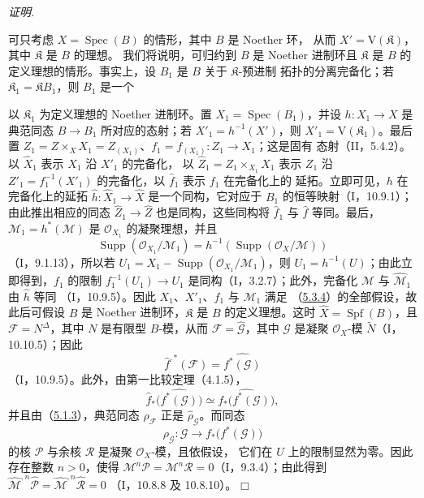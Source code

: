 \documentclass[UTF8,fontset=none,11pt,oneside,openany]{ctexbook}
\providecommand{\square}{\mdlgwhtsquare}
\newenvironment{proof}{%
  \par\smallskip\noindent\textit{证明.}\ %
}{\hfill$\square$\par}
\newcommand{\oldpage}[2][]{%
  \hypertarget{ega-source-page-#1-#2}{}%
  \marginnote{\scriptsize\textbf{#1}~|~#2}\ignorespaces}
\begin{document}
\begin{proof}
可只考虑 $X=\operatorname{Spec}(B)$ 的情形，其中 $B$ 是 Noether 环，
从而 $X'=\mathrm V(\mathfrak K)$，其中 $\mathfrak K$ 是 $B$ 的理想。
我们将说明，可归约到 $B$ 是 Noether 进制环且 $\mathfrak K$ 是 $B$
的定义理想的情形。事实上，设 $B_1$ 是 $B$ 关于 $\mathfrak K$-预进制
拓扑的分离完备化；若 $\mathfrak K_1=\mathfrak K B_1$，则 $B_1$ 是一个

\oldpage[III]{155}

以 $\mathfrak K_1$ 为定义理想的 Noether 进制环。置
$X_1=\operatorname{Spec}(B_1)$，并设 $h:X_1\to X$ 是典范同态
$B\to B_1$ 所对应的态射；若 $X'_1=h^{-1}(X')$，则
$X'_1=\mathrm V(\mathfrak K_1)$。最后置
$Z_1=Z\times_X X_1=Z_{(X_1)}$、$f_1=f_{(X_1)}:Z_1\to X_1$；这是固有
态射（II，5.4.2）。以 $\widehat X_1$ 表示 $X_1$ 沿 $X'_1$ 的完备化，
以 $\widehat Z_1=Z_1\times_{X_1}\widehat X_1$ 表示 $Z_1$ 沿
$Z'_1=f_1^{-1}(X'_1)$ 的完备化，以 $\widehat f_1$ 表示 $f_1$ 在完备化上的
延拓。立即可见，$h$ 在完备化上的延拓
$\widehat h:\widehat X_1\to\widehat X$ 是一个同构，它对应于 $B_1$
的恒等映射（I，10.9.1）；由此推出相应的同态
$\widehat Z_1\to\widehat Z$ 也是同构，这些同构将 $\widehat f_1$ 与
$\widehat f$ 等同。最后，$\mathcal M_1=h^*(\mathcal M)$ 是
$\mathcal O_{X_1}$ 的凝聚理想，并且
\[
\operatorname{Supp}(\mathcal O_{X_1}/\mathcal M_1)
=h^{-1}(\operatorname{Supp}(\mathcal O_X/\mathcal M))
\]
（I，9.1.13），所以若
$U_1=X_1-\operatorname{Supp}(\mathcal O_{X_1}/\mathcal M_1)$，则
$U_1=h^{-1}(U)$；由此立即得到，$f_1$ 的限制
$f_1^{-1}(U_1)\to U_1$ 是同构（I，3.2.7）；此外，完备化
$\widehat{\mathcal M}$ 与 $\widehat{\mathcal M}_1$ 由 $\widehat h$ 等同
（I，10.9.5）。因此 $X_1$、$X'_1$、$f_1$ 与 $\mathcal M_1$ 满足
（\hyperref[III.5.3.4-fr]{5.3.4}）的全部假设，故此后可假设 $B$ 是
Noether 进制环，$\mathfrak K$ 是 $B$ 的定义理想。这时
$\widehat X=\operatorname{Spf}(B)$，且 $\mathcal F=N^\Delta$，其中 $N$
是有限型 $B$-模，从而 $\mathcal F=\widehat{\mathcal G}$，其中
$\mathcal G$ 是凝聚 $\mathcal O_X$-模 $\widetilde N$（I，10.10.5）；因此
\[
\widehat f^{,*}(\mathcal F)=\widehat{f^*(\mathcal G)}
\]
（I，10.9.5）。此外，由第一比较定理（4.1.5），
\[
\widehat f_*\bigl(\widehat{f^*(\mathcal G)}\bigr)
\simeq\widehat{f_*\bigl(f^*(\mathcal G)\bigr)},
\]
并且由（\hyperref[III.5.1.3-fr]{5.1.3}），典范同态
$\rho_{\mathcal F}$ 正是 $\widehat{\rho}_{\mathcal G}$。而同态
\[
\rho_{\mathcal G}:\mathcal G\longrightarrow f_*\bigl(f^*(\mathcal G)\bigr)
\]
的核 $\mathcal P$ 与余核 $\mathcal R$ 是凝聚 $\mathcal O_X$-模，且依假设，
它们在 $U$ 上的限制显然为零。因此存在整数 $n>0$，使得
$\mathcal M^n\mathcal P=\mathcal M^n\mathcal R=0$（I，9.3.4）；由此得到
$\widehat{\mathcal M}^{,n}\widehat{\mathcal P}=
\widehat{\mathcal M}^{,n}\widehat{\mathcal R}=0$
（I，10.8.8 及 10.8.10）。
\end{proof}
\end{document}
